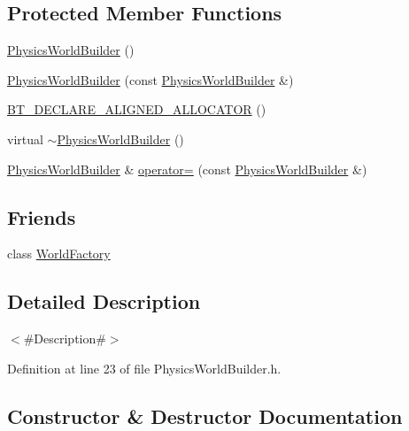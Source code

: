 \subsection*{Protected Member Functions}
\begin{DoxyCompactItemize}
\item 
\mbox{\hyperlink{classnjli_1_1_physics_world_builder_a4c55892d1d68387f494f3bbd0e4cd15a}{Physics\+World\+Builder}} ()
\item 
\mbox{\hyperlink{classnjli_1_1_physics_world_builder_a5054082270de6a969250be2c07c5e95a}{Physics\+World\+Builder}} (const \mbox{\hyperlink{classnjli_1_1_physics_world_builder}{Physics\+World\+Builder}} \&)
\item 
\mbox{\hyperlink{classnjli_1_1_physics_world_builder_af3418db197e13f540c19833932c6a965}{B\+T\+\_\+\+D\+E\+C\+L\+A\+R\+E\+\_\+\+A\+L\+I\+G\+N\+E\+D\+\_\+\+A\+L\+L\+O\+C\+A\+T\+OR}} ()
\item 
virtual \mbox{\hyperlink{classnjli_1_1_physics_world_builder_aaea822b9cc259c6a68d9ad3ad28781d5}{$\sim$\+Physics\+World\+Builder}} ()
\item 
\mbox{\hyperlink{classnjli_1_1_physics_world_builder}{Physics\+World\+Builder}} \& \mbox{\hyperlink{classnjli_1_1_physics_world_builder_a9a9892f6f6dd6ae309f90d79b602caba}{operator=}} (const \mbox{\hyperlink{classnjli_1_1_physics_world_builder}{Physics\+World\+Builder}} \&)
\end{DoxyCompactItemize}
\subsection*{Friends}
\begin{DoxyCompactItemize}
\item 
class \mbox{\hyperlink{classnjli_1_1_physics_world_builder_acb96ebb09abe8f2a37a915a842babfac}{World\+Factory}}
\end{DoxyCompactItemize}


\subsection{Detailed Description}
$<$\#\+Description\#$>$ 

Definition at line 23 of file Physics\+World\+Builder.\+h.



\subsection{Constructor \& Destructor Documentation}
\mbox{\label{classnjli_1_1_physics_world_builder_a4c55892d1d68387f494f3bbd0e4cd15a}} 
